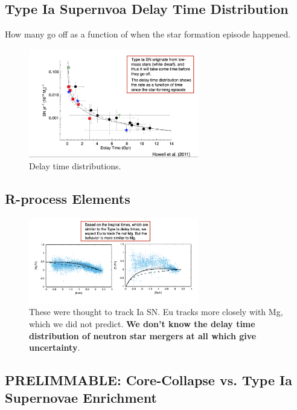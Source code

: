 \documentclass{article}
\begin{document}
\subsection{Type Ia Supernvoa Delay Time Distribution}

How many go off as a function of when the star formation episode happened. 

\begin{figure}
    \centering
    \includegraphics[width=0.66\textwidth]{figs/Screen Shot 2021-10-13 at 9.49.40 AM.png}
    \caption{Delay time distributions.}
    \label{fig:DTD}
\end{figure}

\subsection{R-process Elements}

\begin{figure}
    \centering
    \includegraphics[width=0.66\textwidth]{figs/Screen Shot 2021-10-13 at 9.51.39 AM.png}
    \caption{These were thought to track Ia SN. Eu tracks more closely with Mg, which we did not predict. \textbf{We don't know the delay time distribution of neutron star mergers at all which give uncertainty}.}
    \label{fig:Rprocesselements}
\end{figure}

\subsection{PRELIMMABLE: Core-Collapse vs. Type Ia Supernovae Enrichment}
\end{document}
